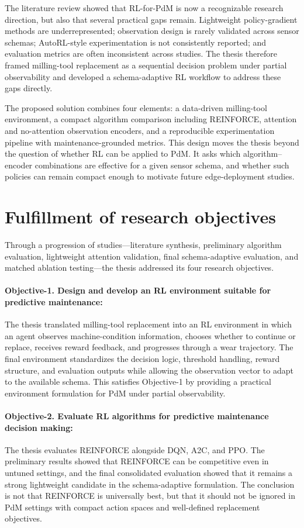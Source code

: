 \documentclass[12pt,oneside]{book}
\begin{document}
The literature review showed that RL-for-PdM is now a recognizable research direction, but also that several practical gaps remain. Lightweight policy-gradient methods are underrepresented; observation design is rarely validated across sensor schemas; AutoRL-style experimentation is not consistently reported; and evaluation metrics are often inconsistent across studies. The thesis therefore framed milling-tool replacement as a sequential decision problem under partial observability and developed a schema-adaptive RL workflow to address these gaps directly.

The proposed solution combines four elements: a data-driven milling-tool environment, a compact algorithm comparison including \textsc{REINFORCE}, attention and no-attention observation encoders, and a reproducible experimentation pipeline with maintenance-grounded metrics. This design moves the thesis beyond the question of whether RL can be applied to PdM. It asks which algorithm--encoder combinations are effective for a given sensor schema, and whether such policies can remain compact enough to motivate future edge-deployment studies.

\section{Fulfillment of research objectives}
Through a progression of studies---literature synthesis, preliminary algorithm evaluation, lightweight attention validation, final schema-adaptive evaluation, and matched ablation testing---the thesis addressed its four research objectives.

\paragraph{Objective-1. Design and develop an RL environment suitable for predictive maintenance:}
The thesis translated milling-tool replacement into an RL environment in which an agent observes machine-condition information, chooses whether to continue or replace, receives reward feedback, and progresses through a wear trajectory. The final environment standardizes the decision logic, threshold handling, reward structure, and evaluation outputs while allowing the observation vector to adapt to the available schema. This satisfies Objective-1 by providing a practical environment formulation for PdM under partial observability.

\paragraph{Objective-2. Evaluate RL algorithms for predictive maintenance decision making:}
The thesis evaluates \textsc{REINFORCE} alongside DQN, A2C, and PPO. The preliminary results showed that \textsc{REINFORCE} can be competitive even in untuned settings, and the final consolidated evaluation showed that it remains a strong lightweight candidate in the schema-adaptive formulation. The conclusion is not that \textsc{REINFORCE} is universally best, but that it should not be ignored in PdM settings with compact action spaces and well-defined replacement objectives.
\end{document}
